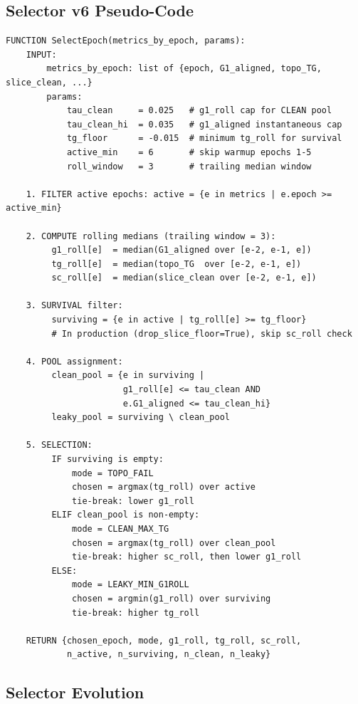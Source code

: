 \subsection{Selector v6 Pseudo-Code}

\begin{lstlisting}
FUNCTION SelectEpoch(metrics_by_epoch, params):
    INPUT:
        metrics_by_epoch: list of {epoch, G1_aligned, topo_TG, slice_clean, ...}
        params:
            tau_clean     = 0.025   # g1_roll cap for CLEAN pool
            tau_clean_hi  = 0.035   # g1_aligned instantaneous cap
            tg_floor      = -0.015  # minimum tg_roll for survival
            active_min    = 6       # skip warmup epochs 1-5
            roll_window   = 3       # trailing median window

    1. FILTER active epochs: active = {e in metrics | e.epoch >= active_min}

    2. COMPUTE rolling medians (trailing window = 3):
         g1_roll[e]  = median(G1_aligned over [e-2, e-1, e])
         tg_roll[e]  = median(topo_TG  over [e-2, e-1, e])
         sc_roll[e]  = median(slice_clean over [e-2, e-1, e])

    3. SURVIVAL filter:
         surviving = {e in active | tg_roll[e] >= tg_floor}
         # In production (drop_slice_floor=True), skip sc_roll check

    4. POOL assignment:
         clean_pool = {e in surviving |
                       g1_roll[e] <= tau_clean AND
                       e.G1_aligned <= tau_clean_hi}
         leaky_pool = surviving \ clean_pool

    5. SELECTION:
         IF surviving is empty:
             mode = TOPO_FAIL
             chosen = argmax(tg_roll) over active
             tie-break: lower g1_roll
         ELIF clean_pool is non-empty:
             mode = CLEAN_MAX_TG
             chosen = argmax(tg_roll) over clean_pool
             tie-break: higher sc_roll, then lower g1_roll
         ELSE:
             mode = LEAKY_MIN_G1ROLL
             chosen = argmin(g1_roll) over surviving
             tie-break: higher tg_roll

    RETURN {chosen_epoch, mode, g1_roll, tg_roll, sc_roll,
            n_active, n_surviving, n_clean, n_leaky}
\end{lstlisting}

\subsection{Selector Evolution}

